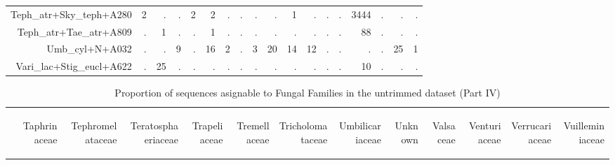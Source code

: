 \documentclass[a4paper, 11]{article}\usepackage[]{graphicx}\usepackage[]{color}
\begin{document}
\begin{table}
\begin{tabular}{rrrrrrrrrrrrrrrrrr}
  Teph\_atr+Sky\_teph+A280 & 2 & . & . & 2 & 2 & . & . & . & . & 1 & . & . & . & 3444 & . & . & . \\ 
  Teph\_atr+Tae\_atr+A809 & . & 1 & . & . & 1 & . & . & . & . & . & . & . & . & 88 & . & . & . \\ 
  Umb\_cyl+N+A032 & . & . & 9 & . & 16 & 2 & . & 3 & 20 & 14 & 12 & . & . & . & . & 25 & 1 \\ 
  Vari\_lac+Stig\_eucl+A622 & . & 25 & . & . & . & . & . & . & . & . & . & . & . & 10 & . & . & . \\ 
   \hline
\end{tabular}
\end{table}
\begin{table}
\centering
\caption[Families ITS1 IV]{Proportion of sequences asignable to Fungal Families in the untrimmed  dataset (Part IV)} 
\begin{tabular}{rrrrrrrrrrrrr}
  \hline
 & \begin{sideways} Taphrinaceae \end{sideways} & \begin{sideways} Tephromelataceae \end{sideways} & \begin{sideways} Teratosphaeriaceae \end{sideways} & \begin{sideways} Trapeliaceae \end{sideways} & \begin{sideways} Tremellaceae \end{sideways} & \begin{sideways} Tricholomataceae \end{sideways} & \begin{sideways} Umbilicariaceae \end{sideways} & \begin{sideways} Unknown \end{sideways} & \begin{sideways} Valsaceae \end{sideways} & \begin{sideways} Venturiaceae \end{sideways} & \begin{sideways} Verrucariaceae \end{sideways} & \begin{sideways} Vuilleminiaceae \end{sideways} \\ 

\end{tabular}
\end{table}
\end{document}
